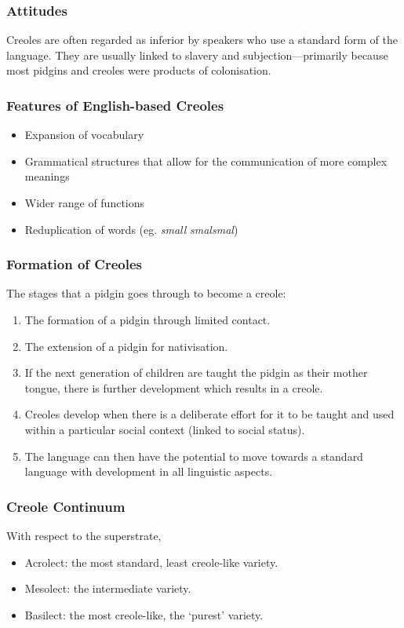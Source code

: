 \documentclass[../main.tex]{subfiles}
\begin{document}
        \subsubsection{Attitudes}
        Creoles are often regarded as inferior by speakers who use a standard form of the language. They are usually linked to slavery and subjection---primarily because most pidgins and creoles were products of colonisation.

        \subsubsection{Features of English-based Creoles}
        \begin{itemize}
            \item Expansion of vocabulary
            \item Grammatical structures that allow for the communication of more complex meanings
            \item Wider range of functions
            \item Reduplication of words (eg. \textit{small} \textrightarrow{} \textit{smalsmal})
        \end{itemize}

        \subsubsection{Formation of Creoles}
        The stages that a pidgin goes through to become a creole:
        \begin{enumerate}
            \item The formation of a pidgin through limited contact.
            \item The extension of a pidgin for nativisation.
            \item If the next generation of children are taught the pidgin as their mother tongue, there is further development which results in a creole.
            \item Creoles develop when there is a deliberate effort for it to be taught and used within a particular social context (linked to social status).
            \item The language can then have the potential to move towards a standard language with development in all linguistic aspects.
        \end{enumerate}
        
        \subsubsection{Creole Continuum}
        With respect to the superstrate,
        \begin{itemize}
            \item Acrolect: the most standard, least creole-like variety.
            \item Mesolect: the intermediate variety.
            \item Basilect: the most creole-like, the `purest' variety.
        \end{itemize}
\end{document}
